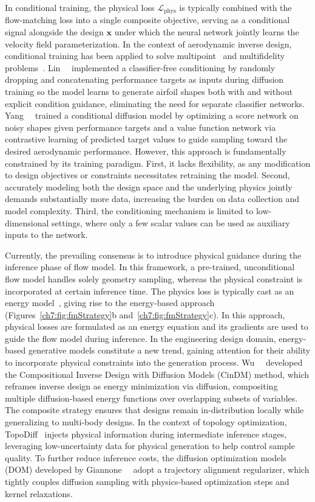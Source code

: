 In conditional training, the physical loss $\mathcal{L}_{\mathrm{phys}}$ is typically combined with the flow-matching loss into a single composite objective, serving as a conditional signal alongside the design $\mathbf{x}$ under which the neural network jointly learns the velocity field parameterization. In the context of aerodynamic inverse design, conditional training has been applied to solve multipoint~\cite{aa.Lin2025} and multifidelity problems~\cite{aa.Yang2024}. Lin~\etal~\cite{aa.Lin2025} implemented a classifier-free conditioning by randomly dropping and concatenating performance targets as inputs during diffusion training so the model learns to generate airfoil shapes both with and without explicit condition guidance, eliminating the need for separate classifier networks. Yang~\etal~\cite{aa.Yang2024} trained a conditional diffusion model by optimizing a score network on noisy shapes given performance targets and a value function network via contrastive learning of predicted target values to guide sampling toward the desired aerodynamic performance. However, this approach is fundamentally constrained by its training paradigm. First, it lacks flexibility, as any modification to design objectives or constraints necessitates retraining the model. Second, accurately modeling both the design space and the underlying physics jointly demands substantially more data, increasing the burden on data collection and model complexity. Third, the conditioning mechanism is limited to low-dimensional settings, where only a few scalar values can be used as auxiliary inputs to the network.

Currently, the prevailing consensus is to introduce physical guidance during the inference phase of flow model. In this framework, a pre-trained, unconditional flow model handles solely geometry sampling, whereas the physical constraint is incorporated at certain inference time. The physics loss is typically cast as an energy model~\cite{ai.LeCun2006}, giving rise to the energy-based approach (Figures~\ref{ch7:fig:fmStrategy}b and~\ref{ch7:fig:fmStrategy}c). In this approach, physical losses are formulated as an energy equation and its gradients are used to guide the flow model during inference. In the engineering design domain, energy-based generative models constitute a new trend, gaining attention for their ability to incorporate physical constraints into the generation process. Wu~\etal~\cite{aa.Wu2024} developed the Compositional Inverse Design with Diffusion Models (CinDM) method, which reframes inverse design as energy minimization via diffusion, compositing multiple diffusion-based energy functions over overlapping subsets of variables. The composite strategy ensures that designs remain in-distribution locally while generalizing to multi-body designs. In the context of topology optimization, TopoDiff~\cite{aa.Maze2023} injects physical information during intermediate inference stages, leveraging low-uncertainty data for physical generation to help control sample quality. To further reduce inference costs, the diffusion optimization models (DOM) developed by Giannone~\etal~\cite{aa.Giannone2023} adopt a trajectory alignment regularizer, which tightly couples diffusion sampling with physics-based optimization steps and kernel relaxations. 

